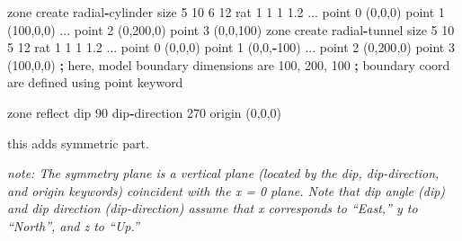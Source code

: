 \documentclass[a4paper, nobind]{templates/ociamthesis}
\newenvironment{Shaded}{\begin{snugshade}}{\end{snugshade}}
\newcommand{\DecValTok}[1]{\textcolor[rgb]{0.00,0.00,0.81}{#1}}
\newcommand{\FloatTok}[1]{\textcolor[rgb]{0.00,0.00,0.81}{#1}}
\newcommand{\NormalTok}[1]{#1}
\newcommand{\OperatorTok}[1]{\textcolor[rgb]{0.81,0.36,0.00}{\textbf{#1}}}
\renewenvironment{Shaded}
{
  \vspace{10pt}%
  \begin{snugshade}%
}{%
  \end{snugshade}%
  \vspace{8pt}%
}
\begin{document}
\begin{Shaded}
\begin{Highlighting}[]
\NormalTok{zone create radial}\OperatorTok{{-}}\NormalTok{cylinder size }\DecValTok{5} \DecValTok{10} \DecValTok{6} \DecValTok{12}\NormalTok{ rat }\DecValTok{1} \DecValTok{1} \DecValTok{1} \FloatTok{1.2}\NormalTok{ ...}
\NormalTok{                           point }\DecValTok{0}\NormalTok{ (}\DecValTok{0}\NormalTok{,}\DecValTok{0}\NormalTok{,}\DecValTok{0}\NormalTok{) point }\DecValTok{1}\NormalTok{ (}\DecValTok{100}\NormalTok{,}\DecValTok{0}\NormalTok{,}\DecValTok{0}\NormalTok{) ...}
\NormalTok{                           point }\DecValTok{2}\NormalTok{ (}\DecValTok{0}\NormalTok{,}\DecValTok{200}\NormalTok{,}\DecValTok{0}\NormalTok{) point }\DecValTok{3}\NormalTok{ (}\DecValTok{0}\NormalTok{,}\DecValTok{0}\NormalTok{,}\DecValTok{100}\NormalTok{)}
\NormalTok{zone create radial}\OperatorTok{{-}}\NormalTok{tunnel size }\DecValTok{5} \DecValTok{10} \DecValTok{5} \DecValTok{12}\NormalTok{ rat }\DecValTok{1} \DecValTok{1} \DecValTok{1} \FloatTok{1.2}\NormalTok{ ...}
\NormalTok{                          point }\DecValTok{0}\NormalTok{ (}\DecValTok{0}\NormalTok{,}\DecValTok{0}\NormalTok{,}\DecValTok{0}\NormalTok{) point }\DecValTok{1}\NormalTok{ (}\DecValTok{0}\NormalTok{,}\DecValTok{0}\NormalTok{,}\OperatorTok{{-}}\DecValTok{100}\NormalTok{) ...}
\NormalTok{                          point }\DecValTok{2}\NormalTok{ (}\DecValTok{0}\NormalTok{,}\DecValTok{200}\NormalTok{,}\DecValTok{0}\NormalTok{) point }\DecValTok{3}\NormalTok{ (}\DecValTok{100}\NormalTok{,}\DecValTok{0}\NormalTok{,}\DecValTok{0}\NormalTok{)}
\OperatorTok{;}\NormalTok{ here, model boundary dimensions are }\DecValTok{100}\NormalTok{, }\DecValTok{200}\NormalTok{, }\DecValTok{100}
\OperatorTok{;}\NormalTok{ boundary coord are defined using point keyword}

\NormalTok{zone reflect dip }\DecValTok{90}\NormalTok{ dip}\OperatorTok{{-}}\NormalTok{direction }\DecValTok{270}\NormalTok{ origin (}\DecValTok{0}\NormalTok{,}\DecValTok{0}\NormalTok{,}\DecValTok{0}\NormalTok{) }
\end{Highlighting}
\end{Shaded}

this adds symmetric part.

\hfill\break
\emph{note: The symmetry plane is a vertical plane (located by the dip,
dip-direction, and origin keywords) coincident with the x = 0 plane.
Note that dip angle (dip) and dip direction (dip-direction) assume that
x corresponds to ``East,'' y to ``North'', and z to ``Up.''}\\
\end{document}
